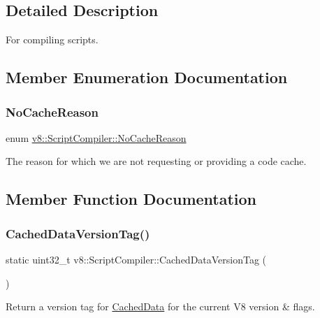 \subsection{Detailed Description}
For compiling scripts. 

\subsection{Member Enumeration Documentation}
\mbox{\label{classv8_1_1ScriptCompiler_a7f13fa15484cfc500ae51927756e0d60}} 
\subsubsection{\texorpdfstring{No\+Cache\+Reason}{NoCacheReason}}
{\footnotesize\ttfamily enum \mbox{\hyperlink{classv8_1_1ScriptCompiler_a7f13fa15484cfc500ae51927756e0d60}{v8\+::\+Script\+Compiler\+::\+No\+Cache\+Reason}}}

The reason for which we are not requesting or providing a code cache. 

\subsection{Member Function Documentation}
\mbox{\label{classv8_1_1ScriptCompiler_aea78877b0dccde1e587ee1ddeda1c155}} 
\subsubsection{\texorpdfstring{Cached\+Data\+Version\+Tag()}{CachedDataVersionTag()}}
{\footnotesize\ttfamily static uint32\+\_\+t v8\+::\+Script\+Compiler\+::\+Cached\+Data\+Version\+Tag (\begin{DoxyParamCaption}{ }\end{DoxyParamCaption})\hspace{0.3cm}{\ttfamily [static]}}

Return a version tag for \mbox{\hyperlink{structv8_1_1ScriptCompiler_1_1CachedData}{Cached\+Data}} for the current V8 version \& flags.

